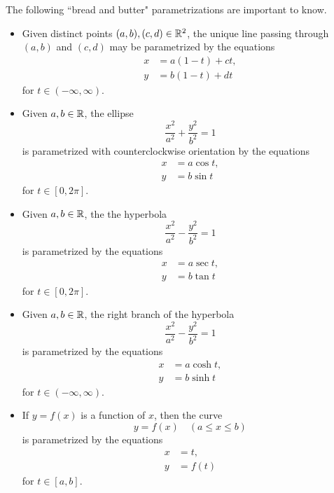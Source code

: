 \newpage

\begin{remark}
The following ``bread and butter" parametrizations are important to know.
\begin{itemize}
\item
Given distinct points $(a,b), (c,d)\in\mathbb R^2$, the unique line passing through $(a,b)$ and $(c,d)$ may be parametrized by the equations
\begin{align*}
x & = a(1-t) + ct,\\
y &=  b(1-t) + dt
\end{align*}
for $t\in (-\infty, \infty)$.
\item
Given $a, b\in \mathbb R$, the ellipse
\begin{equation*}
\frac{x^2}{a^2}+\frac{y^2}{b^2}=1
\end{equation*}
is parametrized with counterclockwise orientation by the equations
\begin{align*}
x & = a\cos t,\\
y &= b\sin t
\end{align*}
for $t\in [0,2\pi]$.
\item
Given $a, b\in \mathbb R$, the the hyperbola
\begin{equation*}
\frac{x^2}{a^2}-\frac{y^2}{b^2}=1
\end{equation*}
is parametrized by the equations
\begin{align*}
x & = a\sec t,\\
y &= b\tan t
\end{align*}
for $t\in [0,2\pi]$.
\item
Given $a, b\in \mathbb R$, the right branch of the hyperbola
\begin{equation*}
\frac{x^2}{a^2}-\frac{y^2}{b^2}=1
\end{equation*}
is parametrized by the equations
\begin{align*}
x & = a\cosh t,\\
y &= b\sinh t
\end{align*}
for $t\in (-\infty,\infty)$.
\item If $y=f(x)$ is a function of $x$, then the curve
\begin{equation*}
y=f(x)\quad (a\le x\le b)
\end{equation*}
is parametrized by the equations
\begin{align*}
x &= t,\\
y &=f(t)
\end{align*}
for $t\in [a,b]$.
\end{itemize}
\end{remark}


